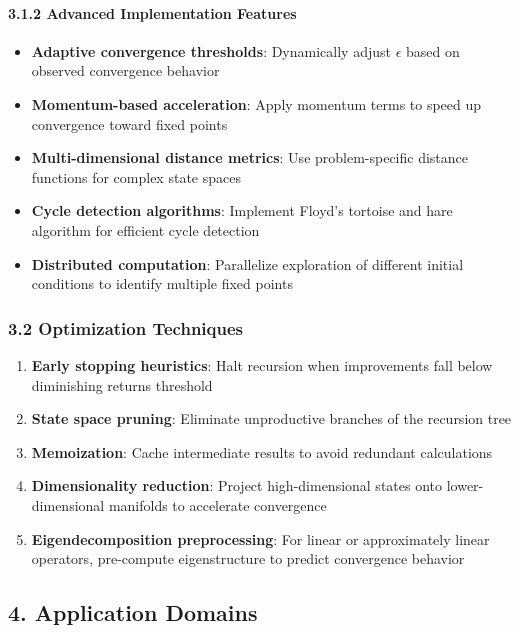 \documentclass[
]{article}
\providecommand{\tightlist}{%
  \setlength{\itemsep}{0pt}\setlength{\parskip}{0pt}}
\begin{document}
\paragraph{3.1.2 Advanced Implementation
Features}\label{advanced-implementation-features}

\begin{itemize}
\tightlist
\item
  \textbf{Adaptive convergence thresholds}: Dynamically adjust
  \(\epsilon \) based on observed convergence behavior
\item
  \textbf{Momentum-based acceleration}: Apply momentum terms to speed up
  convergence toward fixed points
\item
  \textbf{Multi-dimensional distance metrics}: Use problem-specific
  distance functions for complex state spaces
\item
  \textbf{Cycle detection algorithms}: Implement Floyd's tortoise and
  hare algorithm for efficient cycle detection
\item
  \textbf{Distributed computation}: Parallelize exploration of different
  initial conditions to identify multiple fixed points
\end{itemize}

\subsubsection{3.2 Optimization
Techniques}\label{optimization-techniques}

\begin{enumerate}
\def\labelenumi{\arabic{enumi}.}
\tightlist
\item
  \textbf{Early stopping heuristics}: Halt recursion when improvements
  fall below diminishing returns threshold
\item
  \textbf{State space pruning}: Eliminate unproductive branches of the
  recursion tree
\item
  \textbf{Memoization}: Cache intermediate results to avoid redundant
  calculations
\item
  \textbf{Dimensionality reduction}: Project high-dimensional states
  onto lower-dimensional manifolds to accelerate convergence
\item
  \textbf{Eigendecomposition preprocessing}: For linear or approximately
  linear operators, pre-compute eigenstructure to predict convergence
  behavior
\end{enumerate}

\subsection{4. Application Domains}\label{application-domains}
\end{document}
